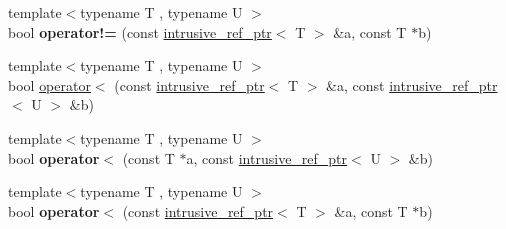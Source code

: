 \begin{DoxyCompactItemize}
\item 
\hypertarget{namespacemiosix_a19e5502e8289695399cbd055e1d88a68}{{\footnotesize template$<$typename T , typename U $>$ }\\bool {\bfseries operator!=} (const \hyperlink{classmiosix_1_1intrusive__ref__ptr}{intrusive\-\_\-ref\-\_\-ptr}$<$ T $>$ \&a, const T $\ast$b)}\label{namespacemiosix_a19e5502e8289695399cbd055e1d88a68}

\item 
{\footnotesize template$<$typename T , typename U $>$ }\\bool \hyperlink{namespacemiosix_a90bf45d6a3bf58180fc1039a2528605e}{operator$<$} (const \hyperlink{classmiosix_1_1intrusive__ref__ptr}{intrusive\-\_\-ref\-\_\-ptr}$<$ T $>$ \&a, const \hyperlink{classmiosix_1_1intrusive__ref__ptr}{intrusive\-\_\-ref\-\_\-ptr}$<$ U $>$ \&b)
\item 
\hypertarget{namespacemiosix_a568fa2771259c5576711d2c2a342daf2}{{\footnotesize template$<$typename T , typename U $>$ }\\bool {\bfseries operator$<$} (const T $\ast$a, const \hyperlink{classmiosix_1_1intrusive__ref__ptr}{intrusive\-\_\-ref\-\_\-ptr}$<$ U $>$ \&b)}\label{namespacemiosix_a568fa2771259c5576711d2c2a342daf2}

\item 
\hypertarget{namespacemiosix_a18fd191f3c3dca5d92621c85abcdc8bb}{{\footnotesize template$<$typename T , typename U $>$ }\\bool {\bfseries operator$<$} (const \hyperlink{classmiosix_1_1intrusive__ref__ptr}{intrusive\-\_\-ref\-\_\-ptr}$<$ T $>$ \&a, const T $\ast$b)}\label{namespacemiosix_a18fd191f3c3dca5d92621c85abcdc8bb}


\end{DoxyCompactItemize}
